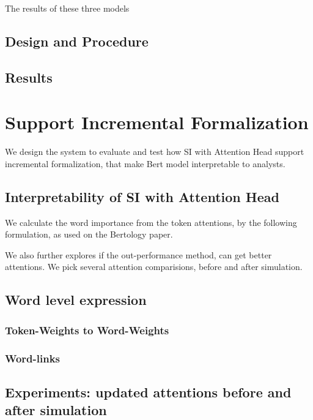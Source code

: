 \documentclass[manuscript,screen]{acmart}
\begin{document}
The results of these three models

\subsection{Design and Procedure}


\subsection{Results}





\section{Support Incremental Formalization}

We design the system to evaluate and test how SI with Attention Head support incremental formalization, that make Bert model interpretable to analysts. 


\subsection{Interpretability of SI with Attention Head}

We calculate the word importance from the token attentions, by the following formulation, as used on the Bertology paper. 


We also further explores if the out-performance method, can get better attentions. We pick several attention comparisions, before and after simulation. 

\subsection{Word level expression}
\subsubsection{Token-Weights to Word-Weights}


\subsubsection{Word-links}



\subsection{Experiments: updated attentions before and after simulation}
\end{document}
